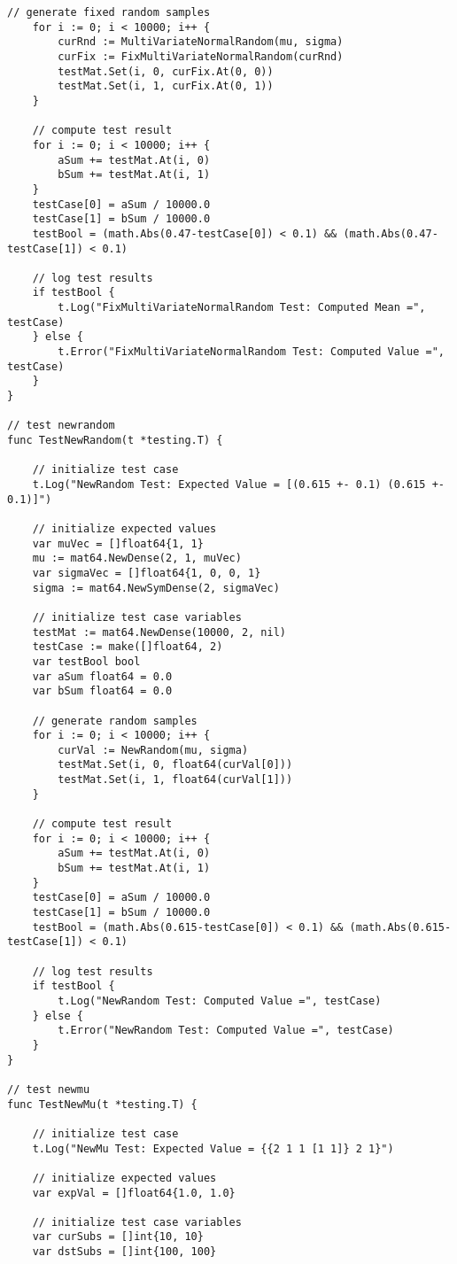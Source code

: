 \begin{lstlisting}[basicstyle=\tiny]
	// generate fixed random samples
	for i := 0; i < 10000; i++ {
		curRnd := MultiVariateNormalRandom(mu, sigma)
		curFix := FixMultiVariateNormalRandom(curRnd)
		testMat.Set(i, 0, curFix.At(0, 0))
		testMat.Set(i, 1, curFix.At(0, 1))
	}

	// compute test result
	for i := 0; i < 10000; i++ {
		aSum += testMat.At(i, 0)
		bSum += testMat.At(i, 1)
	}
	testCase[0] = aSum / 10000.0
	testCase[1] = bSum / 10000.0
	testBool = (math.Abs(0.47-testCase[0]) < 0.1) && (math.Abs(0.47-testCase[1]) < 0.1)

	// log test results
	if testBool {
		t.Log("FixMultiVariateNormalRandom Test: Computed Mean =", testCase)
	} else {
		t.Error("FixMultiVariateNormalRandom Test: Computed Value =", testCase)
	}
}

// test newrandom
func TestNewRandom(t *testing.T) {

	// initialize test case
	t.Log("NewRandom Test: Expected Value = [(0.615 +- 0.1) (0.615 +- 0.1)]")

	// initialize expected values
	var muVec = []float64{1, 1}
	mu := mat64.NewDense(2, 1, muVec)
	var sigmaVec = []float64{1, 0, 0, 1}
	sigma := mat64.NewSymDense(2, sigmaVec)

	// initialize test case variables
	testMat := mat64.NewDense(10000, 2, nil)
	testCase := make([]float64, 2)
	var testBool bool
	var aSum float64 = 0.0
	var bSum float64 = 0.0

	// generate random samples
	for i := 0; i < 10000; i++ {
		curVal := NewRandom(mu, sigma)
		testMat.Set(i, 0, float64(curVal[0]))
		testMat.Set(i, 1, float64(curVal[1]))
	}

	// compute test result
	for i := 0; i < 10000; i++ {
		aSum += testMat.At(i, 0)
		bSum += testMat.At(i, 1)
	}
	testCase[0] = aSum / 10000.0
	testCase[1] = bSum / 10000.0
	testBool = (math.Abs(0.615-testCase[0]) < 0.1) && (math.Abs(0.615-testCase[1]) < 0.1)

	// log test results
	if testBool {
		t.Log("NewRandom Test: Computed Value =", testCase)
	} else {
		t.Error("NewRandom Test: Computed Value =", testCase)
	}
}

// test newmu
func TestNewMu(t *testing.T) {

	// initialize test case
	t.Log("NewMu Test: Expected Value = {{2 1 1 [1 1]} 2 1}")

	// initialize expected values
	var expVal = []float64{1.0, 1.0}

	// initialize test case variables
	var curSubs = []int{10, 10}
	var dstSubs = []int{100, 100}


\end{lstlisting}
